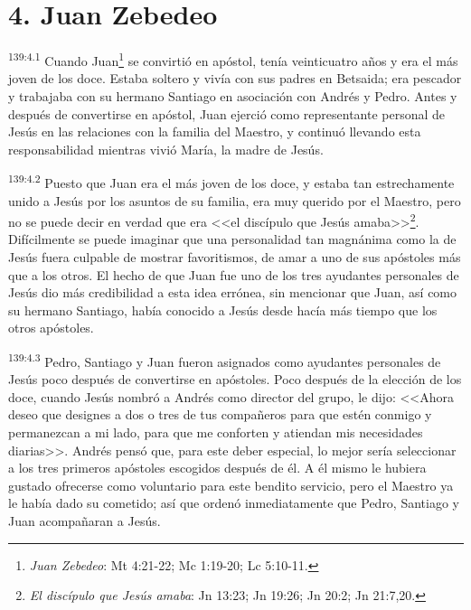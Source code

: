 \section*{4. Juan Zebedeo}
\par 
\textsuperscript{139:4.1} Cuando Juan\footnote{\textit{Juan Zebedeo}: Mt 4:21-22; Mc 1:19-20; Lc 5:10-11.} se convirtió en apóstol, tenía veinticuatro años y era el más joven de los doce. Estaba soltero y vivía con sus padres en Betsaida; era pescador y trabajaba con su hermano Santiago en asociación con Andrés y Pedro. Antes y después de convertirse en apóstol, Juan ejerció como representante personal de Jesús en las relaciones con la familia del Maestro, y continuó llevando esta responsabilidad mientras vivió María, la madre de Jesús.

\par 
\textsuperscript{139:4.2} Puesto que Juan era el más joven de los doce, y estaba tan estrechamente unido a Jesús por los asuntos de su familia, era muy querido por el Maestro, pero no se puede decir en verdad que era <<el discípulo que Jesús amaba>>\footnote{\textit{El discípulo que Jesús amaba}: Jn 13:23; Jn 19:26; Jn 20:2; Jn 21:7,20.}. Difícilmente se puede imaginar que una personalidad tan magnánima como la de Jesús fuera culpable de mostrar favoritismos, de amar a uno de sus apóstoles más que a los otros. El hecho de que Juan fue uno de los tres ayudantes personales de Jesús dio más credibilidad a esta idea errónea, sin mencionar que Juan, así como su hermano Santiago, había conocido a Jesús desde hacía más tiempo que los otros apóstoles.

\par 
\textsuperscript{139:4.3} Pedro, Santiago y Juan fueron asignados como ayudantes personales de Jesús poco después de convertirse en apóstoles. Poco después de la elección de los doce, cuando Jesús nombró a Andrés como director del grupo, le dijo: <<Ahora deseo que designes a dos o tres de tus compañeros para que estén conmigo y permanezcan a mi lado, para que me conforten y atiendan mis necesidades diarias>>. Andrés pensó que, para este deber especial, lo mejor sería seleccionar a los tres primeros apóstoles escogidos después de él. A él mismo le hubiera gustado ofrecerse como voluntario para este bendito servicio, pero el Maestro ya le había dado su cometido; así que ordenó inmediatamente que Pedro, Santiago y Juan acompañaran a Jesús.

